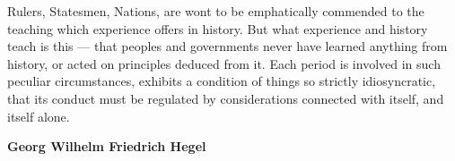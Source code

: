\begin{dedication}
  Rulers, Statesmen, Nations, are wont to be emphatically commended to the
  teaching which experience offers in history. But what experience and history
  teach is this --- that peoples and governments never have learned anything
  from history, or acted on principles deduced from it. Each period is involved
  in such peculiar circumstances, exhibits a condition of things so strictly
  idiosyncratic, that its conduct must be regulated by considerations connected
  with itself, and itself alone.

  \vspace{\baselineskip}
  \raggedleft  \Large \bfseries  Georg Wilhelm Friedrich Hegel
\end{dedication} 
